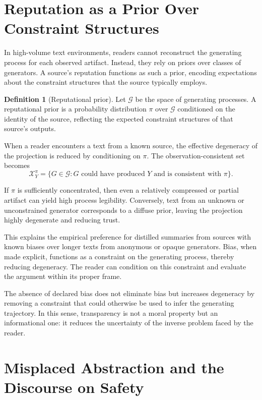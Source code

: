 \documentclass[12pt, oneside]{article}
\theoremstyle{plain}
\theoremstyle{definition}
\newtheorem{definition}[theorem]{Definition}
\theoremstyle{remark}
\newcommand{\config}{\mathcal{X}}
\begin{document}
\section{Reputation as a Prior Over Constraint Structures}

In high-volume text environments, readers cannot reconstruct the generating process for
each observed artifact. Instead, they rely on priors over classes of generators. A source's
reputation functions as such a prior, encoding expectations about the constraint structures
that the source typically employs.

\begin{definition}[Reputational prior]
Let $\mathcal{G}$ be the space of generating processes. A reputational prior is a probability
distribution $\pi$ over $\mathcal{G}$ conditioned on the identity of the source, reflecting
the expected constraint structures of that source's outputs.
\end{definition}

When a reader encounters a text from a known source, the effective degeneracy of the
projection is reduced by conditioning on $\pi$. The observation-consistent set becomes
\[
  \config_{Y}^{\pi} = \{ G \in \mathcal{G} : G \text{ could have produced } Y \text{ and is
  consistent with } \pi \}.
\]

If $\pi$ is sufficiently concentrated, then even a relatively compressed or partial
artifact can yield high process legibility. Conversely, text from an unknown or
unconstrained generator corresponds to a diffuse prior, leaving the projection highly
degenerate and reducing trust.

This explains the empirical preference for distilled summaries from sources with known
biases over longer texts from anonymous or opaque generators. Bias, when made explicit,
functions as a constraint on the generating process, thereby reducing degeneracy. The
reader can condition on this constraint and evaluate the argument within its proper frame.

The absence of declared bias does not eliminate bias but increases degeneracy by removing
a constraint that could otherwise be used to infer the generating trajectory. In this
sense, transparency is not a moral property but an informational one: it reduces the
uncertainty of the inverse problem faced by the reader.

\section{Misplaced Abstraction and the Discourse on Safety}
\end{document}
